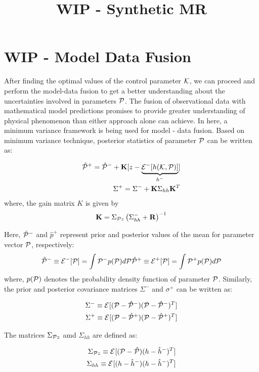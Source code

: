 \documentclass{article}         %
\title{WIP - Synthetic MR }
\author{}
\theoremstyle{definition}
\theoremstyle{remark}
\begin{document}
\section{WIP - Model Data Fusion}\label{da}
After finding the optimal values of the control parameter $\kk$, we can proceed and perform the model-data fusion to get a better understanding about the uncertainties involved in parameters $\p$.
The fusion of observational data with mathematical model predictions promises to provide greater understanding of physical phenomenon than either approach alone can achieve. In here, a minimum variance framework is being used for model - data fusion. Based on minimum variance technique, posterior statistics of parameter $\p$ can be written as:

\begin{eqnarray}
\hat{\p}^+=\hat{\p}^-+\K[z-\underbrace{\Ex{h(\kk,\p)}{-}}_{h^-}]\label{minvarmean}\\
\Sigma^+=\Sigma^-+\K\Sigma_{hh}\K^T\label{minvarvar}
\end{eqnarray}
where, %
the gain matrix $K$ is given by
\begin{eqnarray}\label{kgain}
\K=\Sigma_{\p z}\left(\Sigma_{hh}^-+\R\right)^{-1}
\end{eqnarray}

Here, $\hat{\p}^-$ and $\hat{p}^+$ represent prior and posterior values of the mean for parameter vector $\p$, respectively:
\begin{eqnarray}
\hat{\p}^-\equiv \Ex{\p}{-}=\int \p^- p(\p)d\p \label{Pprior}
\hat{\p}^+\equiv \Ex{\p}{+}=\int \p^+ p(\p)d\p \label{Pposterior}
\end{eqnarray}
where, $p(\p)$ denotes the probability density function of parameter $\p$. Similarly, the prior and posterior covariance matrices $\Sigma^{-}$ and $\sigma^+$ can be written as:

\begin{eqnarray}
\Sigma^-\equiv\Ex{(\p-\hat{\p}^-)(\p-\hat{\p}^-)^T}{}\\
\Sigma^+\equiv\Ex{(\p-\hat{\p}^+)(\p-\hat{\p}^+)^T}{}
\end{eqnarray}

The matrices $\Sigma_{\p z}$ amd $\Sigma_{hh}$ are defined as:

\begin{eqnarray}
\Sigma_{\p z} \equiv\Ex{(\p-\hat{\p})(h-\hat{h}^-)^T}{}\\
\Sigma_{hh} \equiv\Ex{(h-\hat{h}^-)(h-\hat{h}^-)^T}{}
\end{eqnarray}
\end{document}

